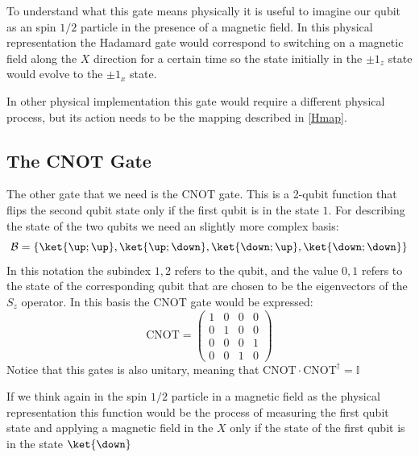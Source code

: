 To understand what this gate means physically it is useful to imagine our qubit as an spin $1/2$ particle in the presence of a magnetic field.
In this physical representation the Hadamard gate would correspond to switching on a magnetic field along the $X$ direction for a certain time so the state initially in the $\pm1_z$ state would evolve to the $\pm1_x$ state.

In other physical implementation this gate would require a different physical process, but its action needs to be the mapping described in \eqref{Hmap}.


\subsection{The CNOT Gate}
The other gate that we need is the CNOT gate. This is a 2-qubit function that flips the second qubit state only if the first qubit is in the state $1$. For describing the state of the two qubits we need an slightly more complex basis:
\begin{equation}
  \mathcal{B}=\left\{
  \ket{\up;\up},\ket{\up;\down},\ket{\down;\up},\ket{\down;\down}
  \right\}
\end{equation}
 In this notation the subindex $1,2$ refers to the qubit, and the value $0,1$ refers to the state of the corresponding qubit that are chosen to be the eigenvectors of the $S_z$ operator.
In this basis the CNOT gate would be expressed:
\begin{equation}
  \text{CNOT}=\left(\begin{array}{cc|cc}
  1 & 0 & 0 & 0 \\
  0 & 1 & 0 & 0 \\\hline
  0 & 0 & 0 & 1 \\
  0 & 0 & 1 & 0
  \end{array}\right)
\end{equation}
Notice that this gates %
is also unitary, meaning that $\text{CNOT}\cdot\text{CNOT}^{\dagger}=\mathbb{I}$


If we think again in the spin $1/2$ particle in a magnetic field as the physical representation this function would be the process of measuring the first qubit state and applying a magnetic field in the $X$ only if the state of the first qubit is in the state $\ket{\down}$ %

